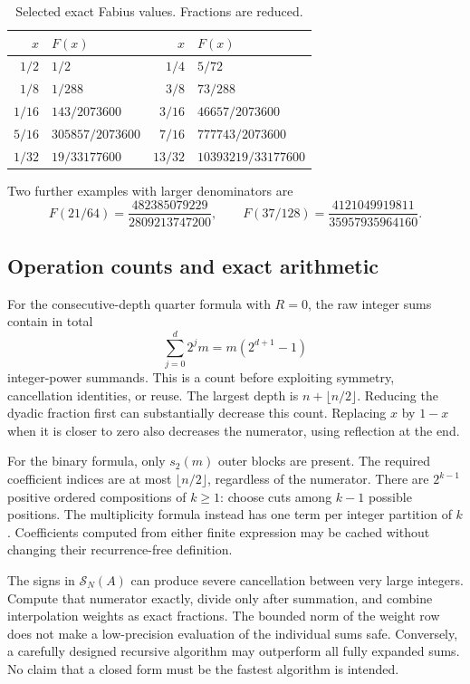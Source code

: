 \documentclass[11pt,a4paper]{article}
\numberwithin{equation}{section}
\theoremstyle{definition}
\theoremstyle{remark}
\newcommand{\bits}{s_2}
\begin{document}
\begin{table}[htbp]
\centering
\caption{Selected exact Fabius values. Fractions are reduced.}
\label{tab:values}
\renewcommand{\arraystretch}{1.3}
\begin{tabular}{@{}rl@{\qquad}rl@{}}
\toprule
$x$ & $F(x)$ & $x$ & $F(x)$\\
\midrule
$1/2$ & $1/2$ & $1/4$ & $5/72$\\
$1/8$ & $1/288$ & $3/8$ & $73/288$\\
$1/16$ & $143/2073600$ & $3/16$ & $46657/2073600$\\
$5/16$ & $305857/2073600$ & $7/16$ & $777743/2073600$\\
$1/32$ & $19/33177600$ & $13/32$ & $10393219/33177600$\\
\bottomrule
\end{tabular}
\end{table}
Two further examples with larger denominators are
\[
 F(21/64)=\frac{482385079229}{2809213747200},\qquad
 F(37/128)=\frac{4121049919811}{35957935964160}.
\]

\subsection{Operation counts and exact arithmetic}
For the consecutive-depth quarter formula with $R=0$, the raw integer sums contain in total
\begin{equation}
 \sum_{j=0}^{d}2^jm=m(2^{d+1}-1)
 \label{eq:power-term-count}
\end{equation}
integer-power summands. This is a count before exploiting symmetry, cancellation identities, or reuse. The largest depth is $n+\lfloor n/2\rfloor$. Reducing the dyadic fraction first can substantially decrease this count. Replacing $x$ by $1-x$ when it is closer to zero also decreases the numerator, using reflection at the end.

For the binary formula, only $\bits(m)$ outer blocks are present. The required coefficient indices are at most $\lfloor n/2\rfloor$, regardless of the numerator. There are $2^{k-1}$ positive ordered compositions of $k\ge1$: choose cuts among $k-1$ possible positions. The multiplicity formula instead has one term per integer partition of $k$. Coefficients computed from either finite expression may be cached without changing their recurrence-free definition.

The signs in $\mathcal S_N(A)$ can produce severe cancellation between very large integers. Compute that numerator exactly, divide only after summation, and combine interpolation weights as exact fractions. The bounded norm of the weight row does not make a low-precision evaluation of the individual sums safe. Conversely, a carefully designed recursive algorithm may outperform all fully expanded sums. No claim that a closed form must be the fastest algorithm is intended.
\end{document}
